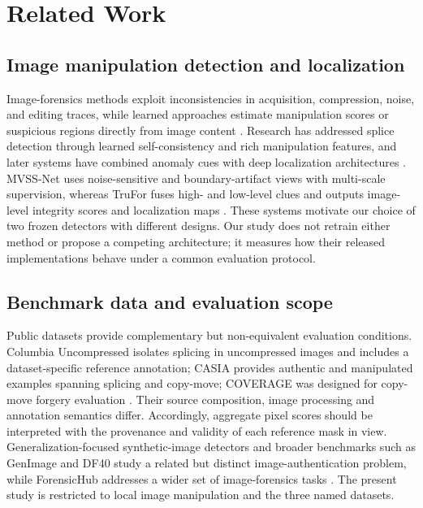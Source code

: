 \section{Related Work}

\subsection{Image manipulation detection and localization}
Image-forensics methods exploit inconsistencies in acquisition, compression, noise, and editing traces, while learned approaches estimate manipulation scores or suspicious regions directly from image content \cite{farid2009imageforgery,verdoliva2020mediaforensics}. Research has addressed splice detection through learned self-consistency and rich manipulation features, and later systems have combined anomaly cues with deep localization architectures \cite{huh2018fighting,zhou2018rich,wu2019mantra,yu2024diffforensics}. MVSS-Net uses noise-sensitive and boundary-artifact views with multi-scale supervision, whereas TruFor fuses high- and low-level clues and outputs image-level integrity scores and localization maps \cite{chen2021mvss,guillaro2023trufor}. These systems motivate our choice of two frozen detectors with different designs. Our study does not retrain either method or propose a competing architecture; it measures how their released implementations behave under a common evaluation protocol.

\subsection{Benchmark data and evaluation scope}
Public datasets provide complementary but non-equivalent evaluation conditions. Columbia Uncompressed isolates splicing in uncompressed images and includes a dataset-specific reference annotation; CASIA provides authentic and manipulated examples spanning splicing and copy-move; COVERAGE was designed for copy-move forgery evaluation \cite{hsu2006columbia,dong2013casia,wen2016coverage}. Their source composition, image processing and annotation semantics differ. Accordingly, aggregate pixel scores should be interpreted with the provenance and validity of each reference mask in view. Generalization-focused synthetic-image detectors and broader benchmarks such as GenImage and DF40 study a related but distinct image-authentication problem, while ForensicHub addresses a wider set of image-forensics tasks \cite{ojha2023universal,zhu2023genimage,yan2024df40,du2025forensichub}. The present study is restricted to local image manipulation and the three named datasets.

